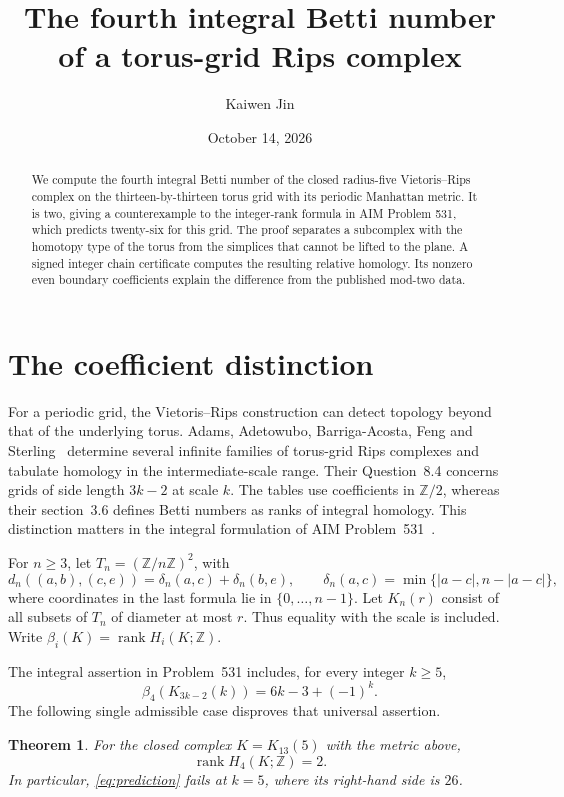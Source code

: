 \documentclass[11pt]{amsart}
\title{The fourth integral Betti number of a torus-grid Rips complex}
\author{Kaiwen Jin}
\date{October 14, 2026}
\newtheorem{theorem}{Theorem}
\newcommand{\Z}{\mathbb Z}
\newcommand{\rank}{\operatorname{rank}}
\begin{document}
\begin{abstract}
We compute the fourth integral Betti number of the closed radius-five
Vietoris--Rips complex on the thirteen-by-thirteen torus grid with its
periodic Manhattan metric. It is two, giving a counterexample to the
integer-rank formula in AIM Problem 531, which predicts twenty-six for this
grid. The proof separates a subcomplex with the homotopy type of the torus
from the simplices that cannot be lifted to the plane. A signed integer
chain certificate computes the resulting relative homology. Its nonzero
even boundary coefficients explain the difference from the published
mod-two data.
\end{abstract}
\maketitle

\section{The coefficient distinction}
For a periodic grid, the Vietoris--Rips construction can detect topology
beyond that of the underlying torus. Adams, Adetowubo, Barriga-Acosta, Feng
and Sterling~\cite{torus} determine several infinite families of torus-grid
Rips complexes and tabulate homology in the intermediate-scale range.
Their Question~8.4 concerns grids of side length $3k-2$ at scale $k$.
The tables use coefficients in $\Z/2$, whereas their section~3.6 defines
Betti numbers as ranks of integral homology. This distinction matters in
the integral formulation of AIM Problem~531~\cite{aim}.

For $n\geq3$, let $T_n=(\Z/n\Z)^2$, with
\[
 d_n((a,b),(c,e))=\delta_n(a,c)+\delta_n(b,e),\qquad
 \delta_n(a,c)=\min\{|a-c|,n-|a-c|\},
\]
where coordinates in the last formula lie in $\{0,\ldots,n-1\}$.
Let $K_n(r)$ consist of all subsets of $T_n$ of diameter at most $r$.
Thus equality with the scale is included. Write
$\beta_i(K)=\rank H_i(K;\Z)$.

The integral assertion in Problem~531 includes, for every integer $k\geq5$,
\begin{equation}\label{eq:prediction}
 \beta_4(K_{3k-2}(k))=6k-3+(-1)^k.
\end{equation}
The following single admissible case disproves that universal assertion.

\begin{theorem}\label{thm:main}
For the closed complex $K=K_{13}(5)$ with the metric above,
\[
 \rank H_4(K;\Z)=2.
\]
In particular, \eqref{eq:prediction} fails at $k=5$, where its right-hand
side is $26$.
\end{theorem}
\end{document}

